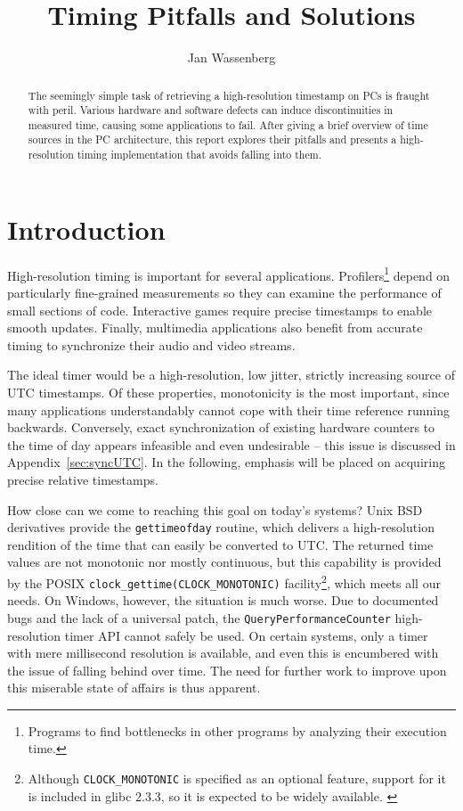 \documentclass[a4paper,12pt,pdftex]{article}
\newcommand{\id}[1]{\texttt{#1}}
\begin{document}
\title{Timing Pitfalls and Solutions}
\author{Jan Wassenberg}
\maketitle

\begin{abstract}
The seemingly simple task of retrieving a high-resolution timestamp on PCs is fraught with peril. Various hardware and software defects can induce discontinuities in measured time, causing some applications to fail. After giving a brief overview of time sources in the PC architecture, this report explores their pitfalls and presents a high-resolution timing implementation that avoids falling into them.
\end{abstract}

\section{Introduction}

High-resolution timing is important for several applications. Profilers\footnote{Programs to find bottlenecks in other programs by analyzing their execution time.} depend on particularly fine-grained measurements so they can examine the performance of small sections of code. Interactive games require precise timestamps to enable smooth updates. Finally, multimedia applications also benefit from accurate timing to synchronize their audio and video streams.

The ideal timer would be a high-resolution, low jitter, strictly increasing source of UTC timestamps. Of these properties, monotonicity is the most important, since many applications understandably cannot cope with their time reference running backwards. Conversely, exact synchronization of existing hardware counters to the time of day appears infeasible and even undesirable -- this issue is discussed in Appendix~\ref{sec:syncUTC}. In the following, emphasis will be placed on acquiring precise relative timestamps.

How close can we come to reaching this goal on today's systems? Unix BSD derivatives provide the \id{gettimeofday} routine, which delivers a high-resolution rendition of the time that can easily be converted to UTC. The returned time values are not monotonic nor mostly continuous, but this capability is provided by the POSIX \id{clock\_gettime(CLOCK\_MONOTONIC)} facility\footnote{Although \id{CLOCK\_MONOTONIC} is specified as an optional feature, support for it is included in glibc 2.3.3, so it is expected to be widely available. \citep{clockMonotonicSupport}}, which meets all our needs.
On Windows, however, the situation is much worse. Due to documented bugs and the lack of a universal patch, the \id{QueryPerformanceCounter} high-resolution timer API cannot safely be used. On certain systems, only a timer with mere millisecond resolution is available, and even this is encumbered with the issue of falling behind over time. The need for further work to improve upon this miserable state of affairs is thus apparent.
\end{document}
